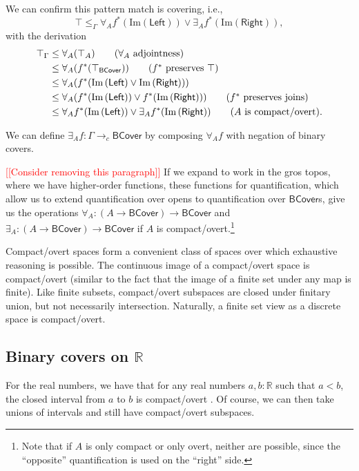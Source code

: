 \documentclass[conference]{IEEEtran}
\newcommand{\cto}{\to_c}
\newcommand{\R}{\mathbb{R}}
\newcommand{\Img}[1]{\text{Im}\left({#1}\right)}
\newcommand{\BCover}{\mathsf{BCover}}
\newcommand{\iimg}[1]{{#1}^*}
\newcommand{\note}[1]{\textcolor{red}{[[{#1}]]}}
\begin{document}
We can confirm this pattern match is covering, i.e.,
\[
\top \le_\Gamma \forall_A \iimg{f}(\Img{\mathsf{Left}}) \vee \exists_A \iimg{f}(\Img{\mathsf{Right}}),
\]
with the derivation
\begin{align*}
\top_\Gamma 
  &\le \forall_A (\top_A) \tag{$\forall_A$ adjointness}
\\ &\le \forall_A (\iimg{f}(\top_\BCover)) \tag{$\iimg{f}$ preserves $\top$}
\\ &\le \forall_A (\iimg{f}(\Img{\mathsf{Left}} \vee \Img{\mathsf{Right}}))
\\ &\le \forall_A(\iimg{f}(\Img{\mathsf{Left}}) \vee \iimg{f}(\Img{\mathsf{Right}}))  \tag{$\iimg{f}$ preserves joins}
\\ &\le \forall_A \iimg{f}(\Img{\mathsf{Left}}) \vee \exists_A \iimg{f}(\Img{\mathsf{Right}}) \tag{$A$ is compact/overt}.
\end{align*}

We can define $\exists_A f : \Gamma \cto \BCover$ by composing $\forall_A f$ with negation of binary covers.

\note{Consider removing this paragraph} If we expand to work in the gros topos, where we have higher-order functions, these functions for quantification, which allow us to extend quantification over opens to quantification over $\BCover$s, give us the operations $\forall_A : (A \to \BCover) \to \BCover$ and $\exists_A : (A \to \BCover) \to \BCover$ if $A$ is compact/overt.\footnote{Note that if $A$ is only compact or only overt, neither are possible, since the ``opposite'' quantification is used on the ``right'' side.}

Compact/overt spaces form a convenient class of spaces over which exhaustive reasoning is possible. The continuous image of a compact/overt space is compact/overt (similar to the fact that the image of a finite set under any map is finite). Like finite subsets, compact/overt subspaces are closed under finitary union, but not necessarily intersection. Naturally, a finite set view as a discrete space is compact/overt.

\subsection{Binary covers on $\R$}

For the real numbers, we have that for any real numbers $a, b : \R$ such that $a < b$, the closed interval from $a$ to $b$ is compact/overt \cite{vickersmetric2}. Of course, we can then take unions of intervals and still have compact/overt subspaces.
\end{document}
